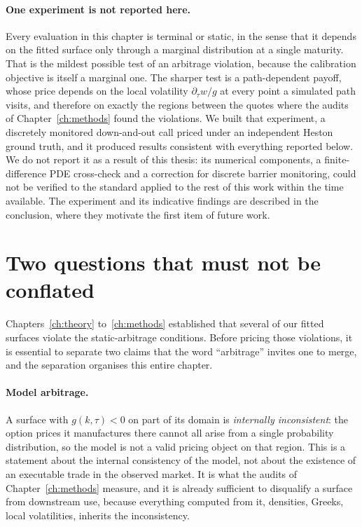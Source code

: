 \paragraph{One experiment is not reported here.} Every evaluation in this chapter is terminal or
static, in the sense that it depends on the fitted surface only through a marginal distribution
at a single maturity. That is the mildest possible test of an arbitrage violation, because the
calibration objective is itself a marginal one. The sharper test is a path-dependent payoff,
whose price depends on the local volatility $\partial_\tau w/g$ at every point a simulated path
visits, and therefore on exactly the regions between the quotes where the audits of
Chapter~\ref{ch:methods} found the violations. We built that experiment, a discretely monitored
down-and-out call priced under an independent Heston ground truth, and it produced results
consistent with everything reported below. We do not report it as a result of this thesis: its
numerical components, a finite-difference PDE cross-check and a correction for discrete barrier
monitoring, could not be verified to the standard applied to the rest of this work within the
time available. The experiment and its indicative findings are described in the conclusion,
where they motivate the first item of future work.

\section{Two questions that must not be conflated}\label{sec:twoquestions}

Chapters~\ref{ch:theory} to~\ref{ch:methods} established that several of our fitted surfaces
violate the static-arbitrage conditions. Before pricing those violations, it is essential to
separate two claims that the word ``arbitrage'' invites one to merge, and the separation
organises this entire chapter.

\paragraph{Model arbitrage.} A surface with $g(k,\tau)<0$ on part of its domain is
\emph{internally inconsistent}: the option prices it manufactures there cannot all arise from a
single probability distribution, so the model is not a valid pricing object on that region. This
is a statement about the internal consistency of the model, not about the existence of an
executable trade in the observed market. It is what the audits of
Chapter~\ref{ch:methods} measure, and it is already sufficient to disqualify a surface from
downstream use, because everything computed from it, densities, Greeks, local volatilities,
inherits the inconsistency.

